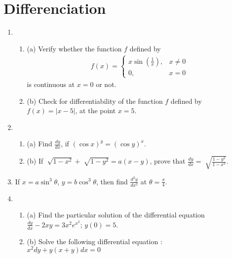 \documentclass {article}
\begin{document}
\section {Differenciation}
\begin {enumerate}

\item \begin {enumerate}
\item[(a)] Verify whether the function $f$ defined by
	\begin{align*}
		f(x) = \begin{cases} x\sin\left(\frac{1}{x}\right), & x\neq 0 \\ 0, & x = 0 \end{cases}
	\end{align*}
	is continuous at $x=0$ or not.
		\item [(b)] Check for differentiability of the function $f$ defined by $f(x) = |x-5|$, at the point $x=5$.
      \end {enumerate}
\item \begin {enumerate}
		\item [(a)] Find $\frac{dy}{dx}$, if $(\cos x)^y = (\cos y)^x$.
		\item [(b)] If $\sqrt[]{1-x^2} + \sqrt[]{1-y^2} = a(x - y)$, prove that $\frac{dy}{dx} = \sqrt[]{\frac{1-y^2}{1-x^2}}$.
	\end {enumerate}


\item If $x = a \sin^3\theta$, $y = b\cos^3\theta$, then find $\frac{d^2y}{dx^2}$ at $\theta = \frac{\pi}{4}$.
\item \begin {enumerate}
\item [(a)] Find the particular solution of the differential equation\\ $\frac{dy}{dx} - 2xy = 3x^2 e^{x^2}$; $y(0) = 5$.
\item [(b)] Solve the following differential equation :\\ $x^2 dy + y(x+y) dx =0$
	\end {enumerate}

\end {enumerate}
\end{document}
